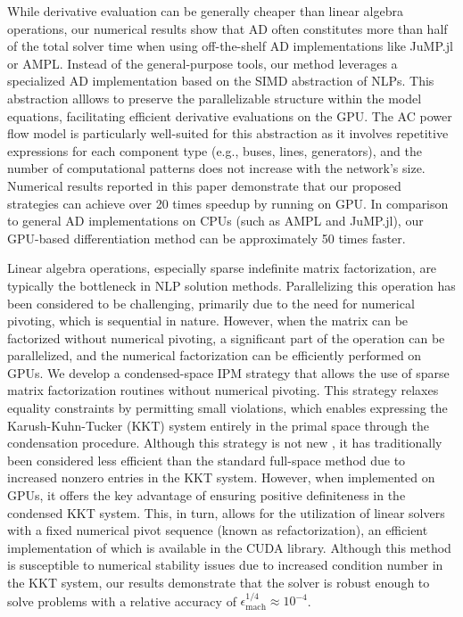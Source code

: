 While derivative evaluation can be generally cheaper than linear
algebra operations, our numerical results show that AD often
constitutes more than half of the total solver time when using
off-the-shelf AD implementations like JuMP.jl or AMPL. Instead of the
general-purpose tools, our method leverages a specialized AD
implementation based on the SIMD abstraction of NLPs. This abstraction
alllows to preserve the parallelizable structure within the model
equations, facilitating efficient derivative evaluations on the
GPU. The AC power flow model is particularly well-suited for this
abstraction as it involves repetitive expressions for each component
type (e.g., buses, lines, generators), and the number of computational
patterns does not increase with the network's size. Numerical results
reported in this paper demonstrate that our proposed strategies can
achieve over 20 times speedup by running on GPU. In comparison to
general AD implementations on CPUs (such as AMPL and JuMP.jl), our
GPU-based  differentiation method can be approximately 50 times faster.

Linear algebra operations, especially sparse indefinite matrix
factorization, are typically the bottleneck in NLP solution methods.
Parallelizing this operation has been considered to be challenging,
primarily due to the need for numerical pivoting, which is sequential
in nature. However, when the matrix can be factorized without
numerical pivoting, a significant part of the operation can be
parallelized, and the numerical factorization can be efficiently
performed on GPUs. We develop a condensed-space IPM strategy that
allows the use of sparse matrix factorization routines without
numerical pivoting. This strategy relaxes equality constraints by
permitting small violations, which enables expressing the
Karush-Kuhn-Tucker (KKT) system entirely in the primal space through
the condensation procedure. Although this strategy is not new
\cite{nocedal2006numerical}, it has traditionally been considered less
efficient than the standard full-space method due to increased nonzero
entries in the KKT system. However, when implemented on GPUs, it
offers the key advantage of ensuring positive definiteness in the
condensed KKT system. This, in turn, allows for the utilization
of linear solvers with a fixed numerical pivot sequence (known as
refactorization), an efficient implementation of which is available in the CUDA library.
Although this method is susceptible to numerical stability issues due to
increased condition number in the KKT system, our results demonstrate
that the solver is robust enough to solve problems with a relative
accuracy of $\epsilon_{\text{mach}}^{1/4}\approx 10^{-4}$. 

